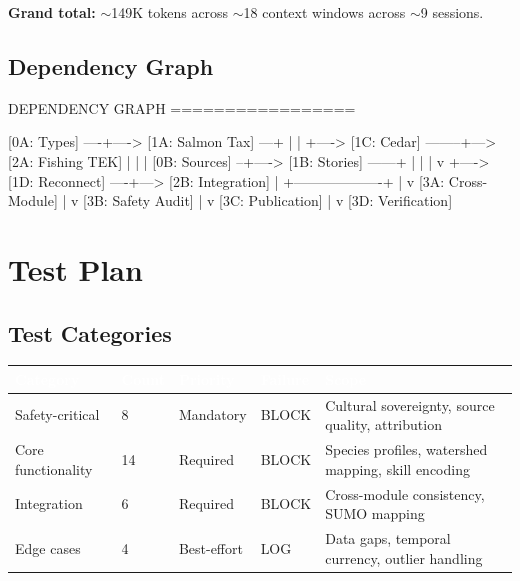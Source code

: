 \documentclass[11pt,letterpaper]{article}
\newcommand{\tableheader}[1]{\textbf{\sffamily\textcolor{white}{#1}}}
\begin{document}
\textbf{Grand total:} $\sim$149K tokens across $\sim$18 context windows across $\sim$9 sessions.

\subsection{Dependency Graph}

\begin{asciibox}
DEPENDENCY GRAPH
=================

[0A: Types] ----+----> [1A: Salmon Tax] ---+
                |                           |
                +----> [1C: Cedar] --------+---> [2A: Fishing TEK]
                |                           |           |
[0B: Sources] --+----> [1B: Stories] ------+           |
                |                           |           v
                +----> [1D: Reconnect] ----+---> [2B: Integration]
                                                        |
                                    +-------------------+
                                    |
                                    v
                            [3A: Cross-Module]
                                    |
                                    v
                            [3B: Safety Audit]
                                    |
                                    v
                            [3C: Publication]
                                    |
                                    v
                            [3D: Verification]
\end{asciibox}

\section{Test Plan}

\subsection{Test Categories}

\begin{center}
\begin{tabularx}{\textwidth}{L{3cm}C{1.2cm}C{1.5cm}C{1.5cm}X}
\toprule
{}
\tableheader{Category} & \tableheader{Count} & \tableheader{Priority} & \tableheader{Failure} & \tableheader{Scope} \\
\midrule
Safety-critical & 8 & Mandatory & BLOCK & Cultural sovereignty, source quality, attribution \\
Core functionality & 14 & Required & BLOCK & Species profiles, watershed mapping, skill encoding \\
Integration & 6 & Required & BLOCK & Cross-module consistency, SUMO mapping \\
Edge cases & 4 & Best-effort & LOG & Data gaps, temporal currency, outlier handling \\
\bottomrule
\end{tabularx}
\end{center}
\end{document}
